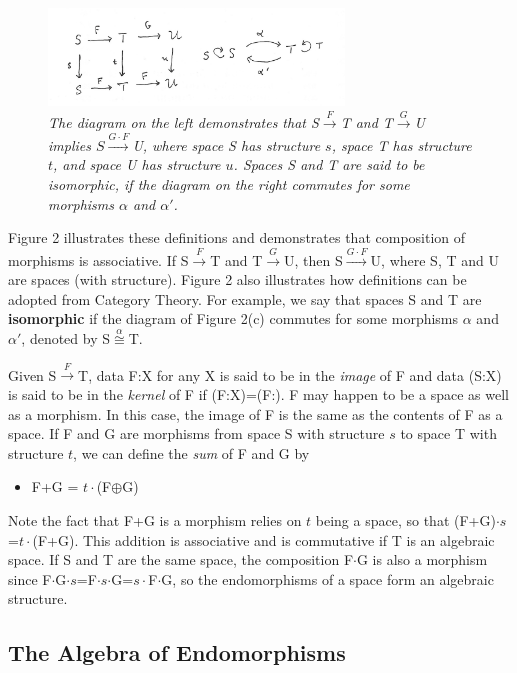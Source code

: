 \documentclass[11pt]{article}
\begin{document}
\begin{figure}[h]
\centering
\includegraphics[width=0.7\textwidth]{Morphisms.png}
\caption{{\it The diagram on the left demonstrates that S${\overset F\longrightarrow}$T and T${\overset G\longrightarrow}$U implies $S{\overset {G\cdot F} \longrightarrow}$U, where space S has structure $s$, space T has structure $t$, and space U has structure $u$.  Spaces S and T are said to be isomorphic, if the diagram on the right commutes for some morphisms $\alpha$ and $\alpha'$.}}
\end{figure}

Figure 2 illustrates these definitions and demonstrates that composition of morphisms is associative.  If S${\overset F\longrightarrow}$T and T${\overset G\longrightarrow}$U, then S${\overset {G\cdot F} \longrightarrow}$U, where S, T and U are spaces (with structure).  Figure 2 also illustrates how 
definitions can be adopted from Category Theory.  For example, we say that spaces S and T are {\bf isomorphic} if the diagram of Figure 2(c) commutes for some morphisms $\alpha$ and $\alpha'$, denoted by S${\overset \alpha \cong}$T.  

Given S${\overset F\longrightarrow}$T, data F:X for any X is said to be in the {\it image} of F and data (S:X) is said to be in the {\it kernel} of F if (F:X)=(F:).  F may happen to be a space as well as a morphism.  In this case, the image of F is the same as the contents of F as a space.  
If F and G are morphisms from space S with structure $s$ to space T with structure $t$, we can define the {\it sum} of F and G by 
\begin{itemize}
\item[] F+G = $t\cdot$(F$\oplus$G)
\end{itemize}
Note the fact that F+G is a morphism relies on $t$ being a space, so that (F+G)$\cdot s$=$t\cdot$(F+G).  This addition is associative and is commutative 
if T is an algebraic space. If S and T are the same space, the composition F$\cdot$G is also a morphism since 
F$\cdot$G$\cdot$$s$=F$\cdot$$s$$\cdot$G=$s\cdot$F$\cdot$G, so the endomorphisms of a space form an algebraic structure.

\subsection{The Algebra of Endomorphisms}  
\end{document}
